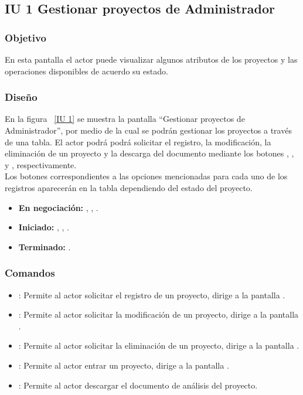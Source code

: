 \subsection{IU 1 Gestionar proyectos de Administrador}
\subsubsection{Objetivo}
	
	En esta pantalla el actor puede visualizar algunos atributos de los proyectos y las operaciones disponibles de acuerdo su estado.

\subsubsection{Diseño}

    En la figura ~\ref{IU 1} se muestra la pantalla ``Gestionar proyectos de Administrador'', por medio de la cual 
    se podrán gestionar los proyectos a través de una tabla. El actor podrá podrá solicitar el registro, la modificación, la eliminación 
    de un proyecto y la descarga del documento mediante los botones
    , \btnEditar, \btnEliminar y  \btnDescargarDoc, respectivamente. \\
    
    Los botones correspondientes a las opciones mencionadas para cada uno de los registros aparecerán en la tabla dependiendo del estado
    del proyecto.
    	
    \begin{itemize}
	    \item {\bf En negociación:} \btnDescargarDoc, \btnEditar, \btnEliminar.
	    \item {\bf Iniciado:} \btnDescargarDoc, \btnEditar, \btnEliminar.
            \item {\bf Terminado:} \btnDescargarDoc.
    \end{itemize}



\subsubsection{Comandos}
\begin{itemize}
	\item {}: Permite al actor solicitar el registro de un proyecto, dirige a la pantalla .
	\item \btnEditar[Modificar]: Permite al actor solicitar la modificación de un proyecto, dirige a la pantalla .
	\item \btnEliminar[Eliminar]: Permite al actor solicitar la eliminación de un proyecto, dirige a la pantalla .
	\item \btnEntrar[Entrar]: Permite al actor entrar un proyecto, dirige a la pantalla .
	\item {}: Permite al actor descargar el documento de análisis del proyecto.
\end{itemize}
